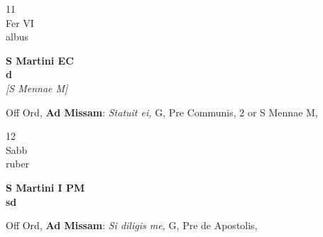 \documentclass[10pt, openany]{book}
\begin{document}
        \begin{center}
            \begin{minipage}{3.5in}
                \vspace{2em}
                \begin{minipage}{0.5in}
                    {\Huge 11} \\
                    {\normalsize Fer VI} \\
                    {\normalsize albus}
                \end{minipage}
                \begin{minipage}{3.0in}
                    \textbf{ \large S Martini EC \\
                    \textnormal{\normalsize d}} \\ \textit{[S Mennae M]} \\ 
                \end{minipage}
                \begin{justify}Off Ord, \textbf{Ad Missam}: \textit{Statuit ei,} G, Pre Communis, 2 or S Mennae M,  
                \end{justify}
            \end{minipage}
        \end{center}
    
        \begin{center}
            \begin{minipage}{3.5in}
                \vspace{2em}
                \begin{minipage}{0.5in}
                    {\Huge 12} \\
                    {\normalsize Sabb} \\
                    {\normalsize ruber}
                \end{minipage}
                \begin{minipage}{3.0in}
                    \textbf{ \large S Martini I PM \\
                    \textnormal{\normalsize sd}} \\ 
                \end{minipage}
                \begin{justify}Off Ord, \textbf{Ad Missam}: \textit{Si diligis me,} G, Pre de Apostolis,  
                \end{justify}
            \end{minipage}
        \end{center}
    
\end{document}
